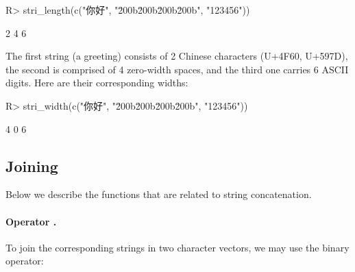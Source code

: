 \documentclass[nojss]{jss}\usepackage[]{graphicx}\usepackage[]{color}
\begin{document}
\begin{Schunk}
\begin{Sinput}
R> stri_length(c("你好", "\u200b\u200b\u200b\u200b", "123456"))
\end{Sinput}
\begin{Soutput}
[1] 2 4 6
\end{Soutput}
\end{Schunk}

\noindent
The first string (a greeting) consists of 2 Chinese characters
(U+4F60, U+597D),
the second is comprised of 4 zero-width spaces, and the third one
carries 6 ASCII digits. Here are their corresponding widths:

\begin{Schunk}
\begin{Sinput}
R> stri_width(c("你好", "\u200b\u200b\u200b\u200b", "123456"))
\end{Sinput}
\begin{Soutput}
[1] 4 0 6
\end{Soutput}
\end{Schunk}












\subsection{Joining}

Below we describe the functions that are related to string concatenation.


\paragraph{Operator .}
To join  the corresponding strings in two character vectors,
we may use the binary  operator:
\end{document}
